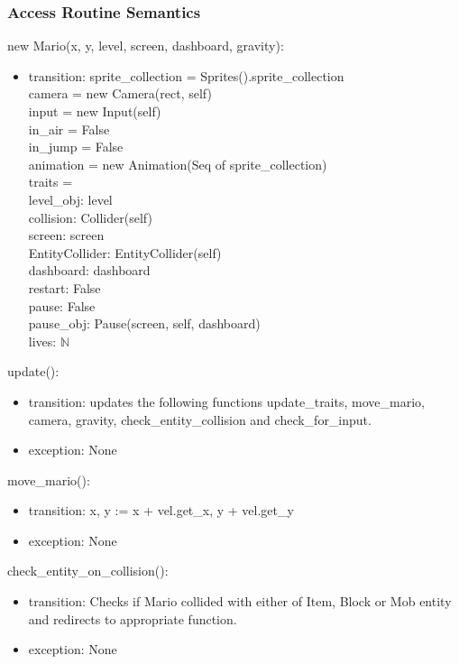\documentclass[12pt]{article}
\begin{document}
\subsubsection*{Access Routine Semantics}
new Mario(x, y, level, screen, dashboard, gravity):
\begin{itemize}
    \item transition: sprite\_collection = Sprites().sprite\_collection\\
camera = new Camera(rect, self)\\
input = new Input(self)\\
in\_air = False\\
in\_jump = False\\
animation = new Animation(Seq of sprite\_collection)\\
traits = \\
level\_obj: level\\
collision: Collider(self)\\
screen: screen\\
EntityCollider: EntityCollider(self)\\
dashboard: dashboard\\
restart: False\\
pause: False\\
pause\_obj: Pause(screen, self, dashboard)\\
lives: $\mathbb{N}$\\
\end{itemize}

update():
\begin{itemize}
    \item transition: updates the following functions update\_traits, move\_mario, camera, gravity, check\_entity\_collision and check\_for\_input.
    \item exception: None
\end{itemize}

move\_mario():
\begin{itemize}
    \item transition: x, y := x + vel.get\_x, y + vel.get\_y
    \item exception: None
\end{itemize}

check\_entity\_on\_collision():
\begin{itemize}
    \item transition: Checks if Mario collided with either of Item, Block or Mob entity and redirects to appropriate function.
    \item exception: None
\end{itemize}
\end{document}
